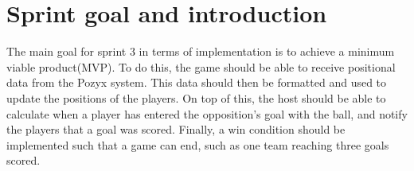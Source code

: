 \section{Sprint goal and introduction}
The main goal for sprint 3 in terms of implementation is to achieve a minimum viable product(MVP).
To do this, the game should be able to receive positional data from the Pozyx system.
This data should then be formatted and used to update the positions of the players.
On top of this, the host should be able to calculate when a player has entered the opposition's goal with the ball, and notify the players that a goal was scored.
Finally, a win condition should be implemented such that a game can end, such as one team reaching three goals scored.
